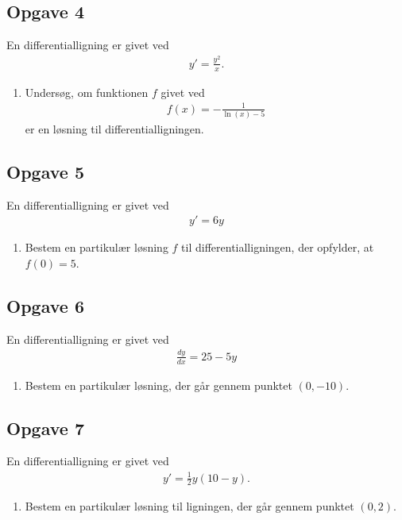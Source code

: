 \subsection*{Opgave 4}
En differentialligning er givet ved
\begin{align*}
	y' = \frac{y^2}{x}.
\end{align*}
\begin{enumerate}[label = \roman*)]
	\item Undersøg, om funktionen $f$ givet ved
	\begin{align*}
		f(x) = -\frac{1}{\ln(x) - 5}
	\end{align*}
	er en løsning til differentialligningen. 
\end{enumerate}

\subsection*{Opgave 5}

En differentialligning er givet ved
\begin{align*}
	y' = 6y
\end{align*}
\begin{enumerate}[label=\roman*)]
	\item Bestem en partikulær løsning $f$ til differentialligningen, der opfylder, at $f(0) = 5$.
\end{enumerate}

\subsection*{Opgave 6}
En differentialligning er givet ved
\begin{align*}
	\frac{dy}{dx} = 25 - 5y
\end{align*}
\begin{enumerate}[label = \roman*)]
	\item Bestem en partikulær løsning, der går gennem punktet $(0,-10)$.
\end{enumerate}

\subsection*{Opgave 7}
En differentialligning er givet ved
\begin{align*}
	y' = \frac{1}{2}y(10-y).
\end{align*}
\begin{enumerate}[label = \roman*)]
	\item Bestem en partikulær løsning til ligningen, der går gennem punktet $(0,2)$.
\end{enumerate}


